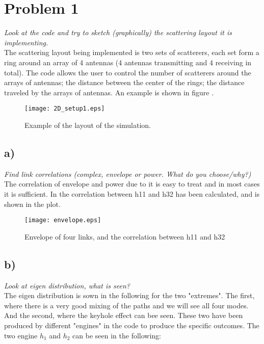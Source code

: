 \section{Problem 1}
\textit{Look at the code and try to sketch (graphically) the scattering layout it is implementing.}\\

The scattering layout being implemented is two sets of scatterers, each set form a ring around an array of 4 antennas (4 antennas transmitting and 4 receiving in total). The code allows the user to control the number of scatterers around the arrays of antennas; the distance between the center of the rings; the distance traveled by the arrays of antennas. An example is shown in figure .

\begin{figure}[!h]
  \centering
  \texttt{[image: 2D\_setup1.eps]}
  \caption{Example of the layout of the simulation.}
  \label{fig:2D_setup1}
\end{figure}

\subsection{a)}
\textit{Find link correlations (complex, envelope or power. What do you choose/why?)}\\

The correlation of envelope and power due to it is easy to treat and in most cases it is sufficient.
In  the correlation between h11 and h32 has been calculated, and is shown in the plot.
\begin{figure}[!h]
  \centering
  \texttt{[image: envelope.eps]}
  \caption{Envelope of four links, and the correlation between h11 and h32}
  \label{fig:Envelope}
\end{figure}

\subsection{b)}
\textit{Look at eigen distribution, what is seen?}\\

The eigen distribution is sown in the following for the two "extremes". The first, where there is a very good mixing of the paths and we will see all four modes. And the second, where the keyhole effect can bee seen. These two have been produced by different "engines" in the code to produce the specific outcomes. The two engine $h_1$ and $h_2$ can be seen in the following:

